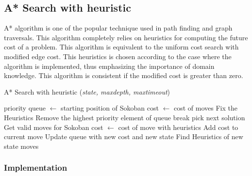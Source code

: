 \subsection{A* Search with heuristic}
\noindent A* algorithm is one of the popular technique used in path finding and graph traversals. This algorithm completely relies on heuristics for computing the future cost of a problem. This algorithm is equivalent to the uniform cost search with modified edge cost. This heuristics is chosen according to the case where the algorithm is implemented, thus emphasizing the importance of domain knowledge. This algorithm is consistent if the modified cost is greater than zero.

\begin{algorithm}[H]
	\caption{A* Search with heuristic (\textit{state, maxdepth, maxtimeout})}
	\label{alg:ucs}
	\begin{algorithmic}[1]
	\State priority queue $\gets$ starting position of Sokoban
	\State cost $\gets$ cost of moves
	\State Fix the Heuristics 
		\State Remove the highest priority element of queue
			\State break
		\Else
				\State pick next solution
			\Else
				\State Get valid moves for Sokoban
					\State cost $\gets$ cost of move with heuristics
					\State Add cost to current move
					\State Update queue with new cost and new state
					\State Find Heuristics of new state
				\EndFor
			\EndIf
		\EndIf
	\EndWhile
	\State \Return moves
	\end{algorithmic}
\end{algorithm}

\subsubsection{Implementation}